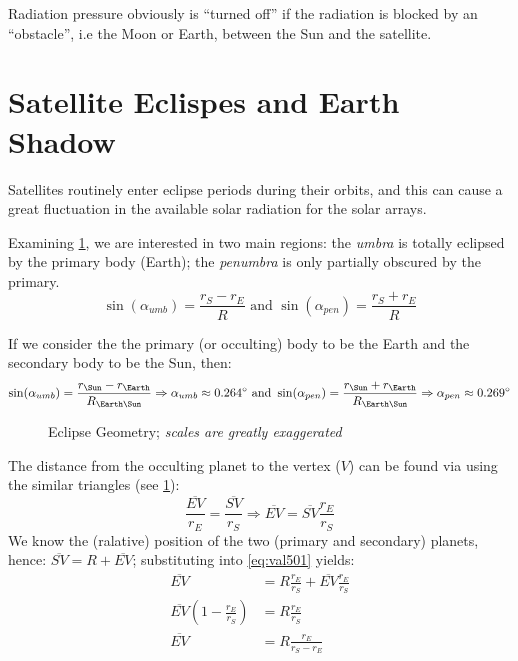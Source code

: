 Radiation pressure obviously is ``turned oﬀ'' if the radiation is blocked by an 
``obstacle'', i.e the Moon or Earth, between the Sun and the satellite. 

\section{Satellite Eclispes and Earth Shadow}
Satellites routinely enter eclipse periods during their orbits, and
this can cause a great fluctuation in the available solar radiation for the solar 
arrays.

Examining \ref{fig:eclipse-geometry}, we are interested in two main regions: the 
\emph{umbra} is totally eclipsed by the primary body (Earth); the \emph{penumbra} 
is only partially obscured by the primary.
\begin{equation}
    \sin({\alpha}_{umb}) = \frac{r_S - r_E}{R} \text{ and }
    \sin({\alpha}_{pen}) = \frac{r_S + r_E}{R}
\end{equation}

If we consider the the primary (or occulting) body to be the Earth and the 
secondary body to be the Sun, then:
\begin{equation}
    \sin({\alpha}_{umb}) = \frac{r_{\Sun} - r_{\Earth}}{R_{\Earth\Sun}} 
    \Rightarrow {\alpha}_{umb} \approx \SI{0.264}{\degree}
    \text{ and }
    \sin({\alpha}_{pen}) = \frac{r_{\Sun} + r_{\Earth}}{R_{\Earth\Sun}}
    \Rightarrow {\alpha}_{pen} \approx \SI{0.269}{\degree}
\end{equation}

\begin{figure}
\centering

\caption{Eclipse Geometry; \emph{scales are greatly exaggerated}}
\label{fig:eclipse-geometry}
\end{figure}

The distance from the occulting planet to the vertex (\(V\)) can be found via 
using the similar triangles (see \ref{fig:eclipse-geometry}):
\begin{equation}
    \label{eq:val501}
    \frac{\overline{EV}}{r_{E}} = \frac{\overline{SV}}{r_S} \Rightarrow \overline{EV} = \overline{SV} \frac{r_E}{r_S}
\end{equation}
We know the (ralative) position of the two (primary and secondary) planets, hence:
\(\overline{SV} = R + \overline{EV}\); substituting into \ref{eq:val501} yields:
\begin{align*}
    \label{eq:val51}
    \overline{EV} &= R \frac{r_E}{r_S} + \overline{EV} \frac{r_E}{r_S} \\
    \overline{EV} (1-\frac{r_E}{r_S}) &= R \frac{r_E}{r_S} \\
    \overline{EV} &= R \frac{r_E}{r_S - r_E}
\end{align*}


